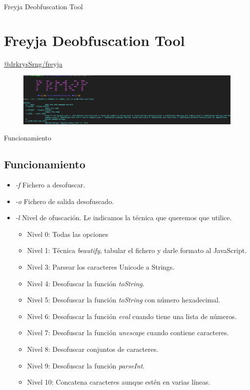 \documentclass[aspectratio=169]{beamer}
\begin{document}
    
  	\begin{frame}{Freyja Deobfuscation Tool}
  	\section{Freyja Deobfuscation Tool}
  		\href{https://github.com/drkrysSrng/freyja}{@drkrysSrng/freyja}
	\begin{figure}[H]
		\centering
		\includegraphics[width=15cm]{images/usage.png}
	\end{figure}
  	
  	\end{frame}
  	\begin{frame}{Funcionamiento}
  	\subsection{Funcionamiento}
	\begin{itemize}
		\item \textit{-f} Fichero a desofuscar.
		\item \textit{-o} Fichero de salida desofuscado.
		\item \textit{-l} Nivel de ofuscación. Le indicamos la técnica que queremos que utilice.
		\begin{itemize}
			\item Nivel 0: Todas las opciones
			\item Nivel 1: Técnica \textit{beautify}, tabular el fichero y darle formato al JavaScript.
			\item Nivel 3: Parsear los caracteres Unicode a Strings.
			\item Nivel 4: Desofuscar la función \textit{toString}.
			\item Nivel 5: Desofuscar la función  \textit{toString} con número hexadecimal.
			\item Nivel 6: Desofuscar la función  \textit{eval} cuando tiene una lista de números.
			\item Nivel 7: Desofuscar la función  \textit{unescape} cuando contiene caracteres.
			\item Nivel 8: Desofuscar conjuntos de caracteres.
			\item Nivel 9: Desofuscar la función  \textit{parseInt}.
			\item Nivel 10: Concatena caracteres aunque estén en varias líneas.
		\end{itemize}
	\end{itemize}
  	\end{frame}
  	
\end{document}
